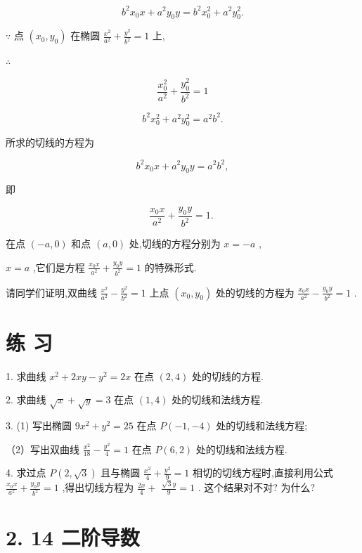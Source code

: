 \documentclass[10pt]{article}
\begin{document}
\[
{b}^{2}{x}_{0}x + {a}^{2}{y}_{0}y = {b}^{2}{x}_{0}^{2} + {a}^{2}{y}_{0}^{2}.
\]

\(\because\) 点 \(\left( {{x}_{0},{y}_{0}}\right)\) 在椭圆 \(\frac{{x}^{2}}{{a}^{2}} + \frac{{y}^{2}}{{b}^{2}} = 1\) 上,

\(\therefore\)

\[
\frac{{x}_{0}^{2}}{{a}^{2}} + \frac{{y}_{0}^{2}}{{b}^{2}} = 1
\]

\[
{b}^{2}{x}_{0}^{2} + {a}^{2}{y}_{0}^{2} = {a}^{2}{b}^{2}.
\]

所求的切线的方程为

\[
{b}^{2}{x}_{0}x + {a}^{2}{y}_{0}y = {a}^{2}{b}^{2},
\]

即

\[
\frac{{x}_{0}x}{{a}^{2}} + \frac{{y}_{0}y}{{b}^{2}} = 1\text{. }
\]

在点 \(\left( {-a,0}\right)\) 和点 \(\left( {a,0}\right)\) 处,切线的方程分别为 \(x = - a\) ,

\(x = a\) ,它们是方程 \(\frac{{x}_{0}x}{{a}^{2}} + \frac{{y}_{0}y}{{b}^{2}} = 1\) 的特殊形式.

请同学们证明,双曲线 \(\frac{{x}^{2}}{{a}^{2}} - \frac{{y}^{2}}{{b}^{2}} = 1\) 上点 \(\left( {{x}_{0},{y}_{0}}\right)\) 处的切线的方程为 \(\frac{{x}_{0}x}{{a}^{2}} - \frac{{y}_{0}y}{{b}^{2}} = 1\) .

\section*{练 习}

1. 求曲线 \({x}^{2} + {2xy} - {y}^{2} = {2x}\) 在点 \(\left( {2,4}\right)\) 处的切线的方程.

2. 求曲线 \(\sqrt{x} + \sqrt{y} = 3\) 在点 \(\left( {1,4}\right)\) 处的切线和法线方程.

3. (1) 写出椭圆 \(9{x}^{2} + {y}^{2} = {25}\) 在点 \(P\left( {-1, - 4}\right)\) 处的切线和法线方程;

（2）写出双曲线 \(\frac{{x}^{2}}{18} - \frac{{y}^{2}}{4} = 1\) 在点 \(P\left( {6,2}\right)\) 处的切线和法线方程.

4. 求过点 \(P\left( {2,\sqrt{3}}\right)\) 且与椭圆 \(\frac{{x}^{2}}{4} + \frac{{y}^{2}}{9} = 1\) 相切的切线方程时,直接利用公式 \(\frac{{x}_{0}x}{{a}^{2}} + \frac{{y}_{0}y}{{b}^{2}} = 1\) ,得出切线方程为 \(\frac{2x}{4} +\) \(\frac{\sqrt{3}y}{9} = 1\) . 这个结果对不对? 为什么?

\section*{2. 14 二阶导数}
\end{document}
